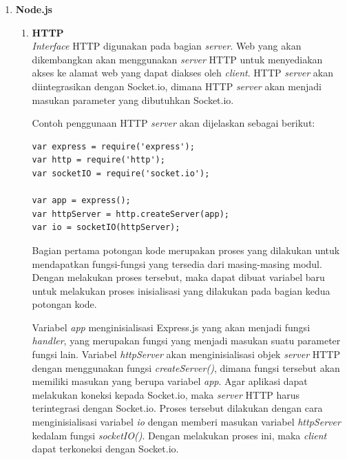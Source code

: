 \begin{enumerate}
	\item \textbf{Node.js}
	\begin{enumerate}
		\item \textbf{HTTP} \\
		\textit{Interface} HTTP digunakan pada bagian \textit{server}. Web yang akan dikembangkan akan menggunakan \textit{server} HTTP untuk menyediakan akses ke alamat web yang dapat diakses oleh \textit{client}. HTTP \textit{server} akan diintegrasikan dengan Socket.io, dimana HTTP \textit{server} akan menjadi masukan parameter yang dibutuhkan Socket.io.
		
		Contoh penggunaan HTTP \textit{server} akan dijelaskan sebagai berikut:
\begin{lstlisting}[caption={Contoh penggunaan \textit{interface} \textit{HTTP}}, label={lst:nodeHTTP}, captionpos=b]
var express = require('express');
var http = require('http');
var socketIO = require('socket.io');

var app = express();
var httpServer = http.createServer(app);
var io = socketIO(httpServer);
\end{lstlisting}

Bagian pertama potongan kode merupakan proses yang dilakukan untuk mendapatkan fungsi-fungsi yang tersedia dari masing-masing modul. Dengan melakukan proses tersebut, maka dapat dibuat variabel baru untuk melakukan proses inisialisasi yang dilakukan pada bagian kedua potongan kode.

Variabel \textit{app} menginisialisasi Express.js yang akan menjadi fungsi \textit{handler}, yang merupakan fungsi yang menjadi masukan suatu parameter fungsi lain. Variabel \textit{httpServer} akan menginisialisasi objek \textit{server} HTTP dengan menggunakan fungsi \textit{createServer()}, dimana fungsi tersebut akan memiliki masukan yang berupa variabel \textit{app}. Agar aplikasi dapat melakukan koneksi kepada Socket.io, maka \textit{server} HTTP harus terintegrasi dengan Socket.io. Proses tersebut dilakukan dengan cara menginisialisasi variabel \textit{io} dengan memberi masukan variabel \textit{httpServer} kedalam fungsi \textit{socketIO()}. Dengan melakukan proses ini, maka \textit{client} dapat terkoneksi dengan Socket.io.

		

\end{enumerate}
\end{enumerate}
